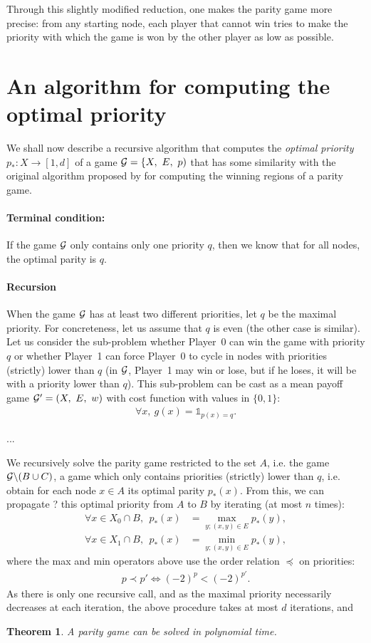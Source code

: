 \documentclass{article}
\newtheorem{theorem}{Theorem}
\def\1{{\mathds 1}}
\def\G{{\cal G}}
\def\pa{Player~0}
\def\pb{Player~1}
\begin{document}
Through this slightly modified reduction, one makes the parity game more precise: from any starting node, each player that cannot win tries to make the priority with which the game is won by the other player as low as possible. 


\section{An algorithm for computing the optimal priority}

We shall now describe a recursive algorithm that computes the \emph{optimal priority} $p_*:X \to [1,d]$ of a game $\G = \{ X,~ E,~ p)$ that has some similarity with the original algorithm proposed by \citet{zielonka98} for computing the winning regions of a parity game. 
\paragraph{Terminal condition:} If the game $\G$ only contains only one priority $q$, then we know that for all nodes, the optimal parity is $q$.
\paragraph{Recursion} When the game $\G$ has at least two different priorities, let $q$ be the maximal priority. For concreteness, let us assume that $q$ is even (the other case is similar).
Let us consider the sub-problem whether \pa{ }can win the game with priority $q$ or whether \pb{ }can force \pa{ }to cycle in nodes with priorities (strictly) lower than $q$ (in $\G$, \pb{ }may win or lose, but if he loses, it will be with a priority lower than $q$). This sub-problem can be cast as a mean payoff game $\G'=(X,~ E,~ w)$ with cost function with values in $\{0,1\}$:
\begin{align}
  \forall x,~ g(x) = \1_{p(x)=q}.
\end{align}

...

We recursively solve the parity game restricted to the set $A$, i.e. the game $\G \backslash (B \cup C)$, a game which only contains priorities (strictly) lower than $q$, i.e. obtain for each node $x \in A$ its optimal parity $p_*(x)$. From this, we can propagate ? this optimal priority from $A$ to $B$ by iterating (at most $n$ times):
\begin{align}
  \forall x \in X_0 \cap B, ~~ p_*(x) &= \max_{y;(x,y)\in E} p_*(y), \\
  \forall x \in X_1 \cap B, ~~ p_*(x) &= \min_{y;(x,y)\in E} p_*(y),
\end{align}
where the max and min operators above use the order relation $\preceq$ on priorities:
\begin{align}
  p \prec p' \Leftrightarrow (-2)^{p}<(-2)^{p'}.  
\end{align}
As there is only one recursive call, and as the maximal priority necessarily decreases at each iteration, the above procedure takes at most $d$ iterations, and
\begin{theorem}
A parity game can be solved in polynomial time.
\end{theorem}



 
\end{document}
